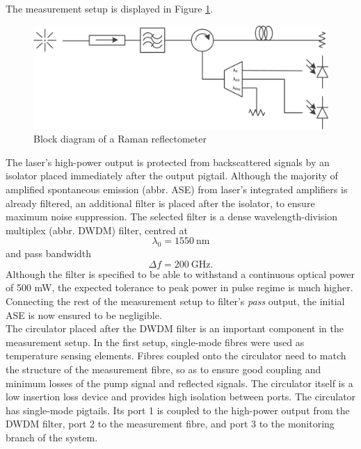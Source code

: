 \documentclass{standalone}
\begin{document}
The measurement setup is displayed in Figure \ref{fig:lab_setup}.
\begin{figure}[b]
	\centering
	\includegraphics[width=\textwidth]{lab_setup.png}
	\caption{Block diagram of a Raman reflectometer}
	\label{fig:lab_setup}
\end{figure}
The laser's high-power output is protected from backscattered signals by an isolator placed immediately after the output pigtail. Although the majority of amplified spontaneous emission (abbr. ASE) from laser's integrated amplifiers is already filtered, an additional filter is placed after the isolator, to ensure maximum noise suppression. The selected filter is a dense wavelength-division multiplex (abbr. DWDM) filter, centred at
\begin{equation} \label{eq:dwdm_filter_centre}
\lambda_0 = \SI{1550}{\nano \meter}
\end{equation} and pass bandwidth 
\begin{equation} \label{eq:dwdm_filter_bw}
\varDelta f = \SI{200}{\giga \hertz} \textrm{.}
\end{equation}
Although the filter is specified to be able to withstand a continuous optical power of 500 mW, the expected tolerance to peak power in pulse regime is much higher. Connecting the rest of the measurement setup to filter's \textit{pass} output, the initial ASE is now ensured to be negligible. \\

The circulator placed after the DWDM filter is an important component in the measurement setup. In the first setup, single-mode fibres were used as temperature sensing elements. Fibres coupled onto the circulator need to match the structure of the measurement fibre, so as to ensure good coupling and minimum losses of the pump signal and reflected signals. The circulator itself is a low insertion loss device and provides high isolation between ports. The circulator has single-mode pigtails. Its port 1 is coupled to the high-power output from the DWDM filter, port 2 to the measurement fibre, and port 3 to the monitoring branch of the system. \\
\end{document}

